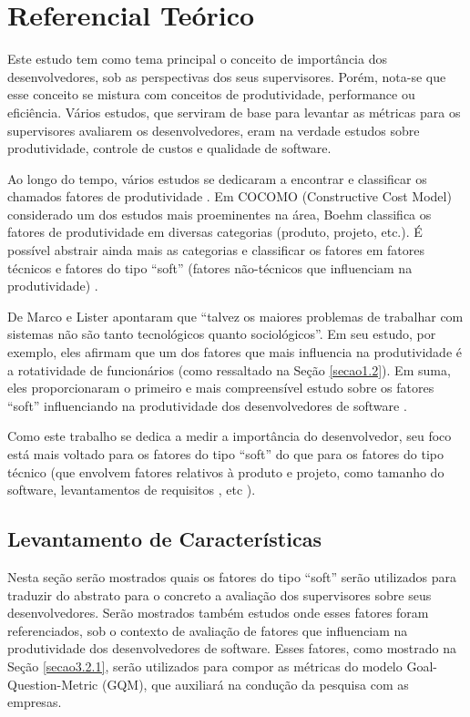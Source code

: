 \chapter[Referencial Teórico]{Referencial Teórico}

Este estudo tem como tema principal o conceito de importância dos desenvolvedores, sob as perspectivas dos seus supervisores. Porém, nota-se que esse conceito se mistura com conceitos de produtividade, performance ou eficiência. Vários estudos, que serviram de base para levantar as métricas para os supervisores avaliarem os desenvolvedores, eram na verdade estudos sobre produtividade, controle de custos e qualidade de software.

Ao longo do tempo, vários estudos se dedicaram a encontrar e classificar os chamados fatores de produtividade \cite{Vosburgh1984, Walston1977,Brooks1981,Hanson1985,Jones1986,Boehm1988,Jones1997,Scudder1991,Banker1991,Boehm1984,Banker1987,Scacchi1995,Briand1998,Jones2000,Lokan2001,Clincy2003,Wagner2008,deBarrosSampaio2010}. Em COCOMO \cite{Boehm2000} (Constructive Cost Model) considerado um dos estudos mais proeminentes na área, Boehm classifica os fatores de produtividade em diversas categorias (produto, projeto, etc.). É possível abstrair ainda mais as categorias e classificar os fatores em fatores técnicos e fatores do tipo “soft” (fatores não-técnicos que influenciam na produtividade) \cite{Wagner2008}.

De Marco e Lister \cite{DeMarco1987} apontaram que “talvez os maiores problemas de trabalhar com sistemas não são tanto tecnológicos quanto sociológicos”. Em seu estudo, por exemplo, eles afirmam que um dos fatores que mais influencia na produtividade é a rotatividade de funcionários (como ressaltado na Seção \ref{secao1.2}). Em suma, eles proporcionaram o primeiro e mais compreensível estudo sobre os fatores “soft” influenciando na produtividade dos desenvolvedores de software \cite{Wagner2008}.

Como este trabalho se dedica a medir a importância do desenvolvedor, seu foco está mais voltado para os fatores do tipo “soft” do que para os fatores do tipo técnico (que envolvem fatores relativos à produto e projeto, como tamanho do software, levantamentos de requisitos , etc \cite{deBarrosSampaio2010}).

\section{Levantamento de Características}\label{referencial_levantamento}
Nesta seção serão mostrados quais os fatores do tipo “soft” serão utilizados para traduzir do abstrato para o concreto a avaliação dos supervisores sobre seus desenvolvedores. Serão mostrados também estudos onde esses fatores foram referenciados, sob o contexto de avaliação de fatores que influenciam na produtividade dos desenvolvedores de software. Esses fatores, como mostrado na Seção \ref{secao3.2.1}, serão utilizados para compor as métricas do modelo Goal-Question-Metric (\acs{GQM}), que auxiliará na condução da pesquisa com as empresas. 

